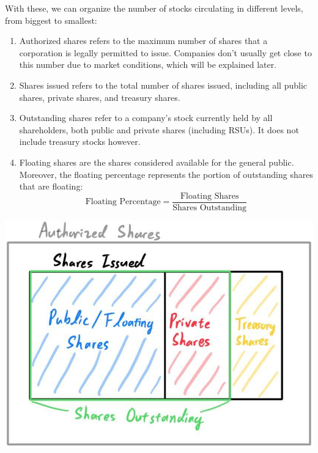 \documentclass{article}
\begin{document}
    \begin{definition}
      With these, we can organize the number of stocks circulating in different levels, from biggest to smallest:
      \begin{enumerate}
        \item Authorized shares refers to the maximum number of shares that a corporation is legally permitted to issue. Companies don't usually get close to this number due to market conditions, which will be explained later. 
        \item Shares issued refers to the total number of shares issued, including all public shares, private shares, and treasury shares. 
        \item Outstanding shares refer to a company's stock currently held by all shareholders, both public and private shares (including RSUs). It does not include treasury stocks however. 
        \item Floating shares are the shares considered available for the general public. Moreover, the floating percentage represents the portion of outstanding shares that are floating: 
        \[\text{Floating Percentage} = \frac{\text{Floating Shares}}{\text{Shares Outstanding}}\]
      \end{enumerate}
      \begin{center}
          \includegraphics[scale=0.25]{img/Shares_Outstanding.jpg}
      \end{center}
    \end{definition}
    
\end{document}
